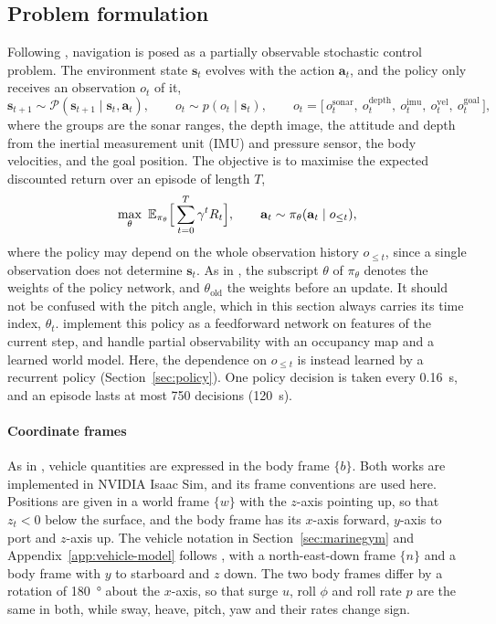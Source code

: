 \subsection{Problem formulation}
\label{sec:problem}
Following \textcite{deowan2026unified}, navigation is posed as a partially observable stochastic control problem. The environment state $\mathbf{s}_t$ evolves with the action $\mathbf{a}_t$, and the policy only receives an observation $o_t$ of it,
\begin{equation}
  \mathbf{s}_{t+1} \sim \mathcal{P}(\mathbf{s}_{t+1} \mid \mathbf{s}_t, \mathbf{a}_t), \qquad
  o_t \sim p(o_t \mid \mathbf{s}_t), \qquad
  o_t = \bigl[\, o^{\mathrm{sonar}}_t,\ o^{\mathrm{depth}}_t,\ o^{\mathrm{imu}}_t,\ o^{\mathrm{vel}}_t,\ o^{\mathrm{goal}}_t \,\bigr],
  \label{eq:observation}
\end{equation}
where the groups are the sonar ranges, the depth image, the attitude and depth from the inertial measurement unit (IMU) and pressure sensor, the body velocities, and the goal position. The objective is to maximise the expected discounted return over an episode of length $T$,
\begin{equation}
  \max_{\theta}\ \mathbb{E}_{\pi_\theta}\Bigl[\,\sum_{t=0}^{T} \gamma^t R_t \Bigr],
  \qquad \mathbf{a}_t \sim \pi_\theta(\mathbf{a}_t \mid o_{\le t}),
  \label{eq:objective}
\end{equation}
where the policy may depend on the whole observation history $o_{\le t}$, since a single observation does not determine $\mathbf{s}_t$. As in \textcite{deowan2026unified}, the subscript $\theta$ of $\pi_\theta$ denotes the weights of the policy network, and $\theta_{\mathrm{old}}$ the weights before an update. It should not be confused with the pitch angle, which in this section always carries its time index, $\theta_t$. \textcite{deowan2026unified} implement this policy as a feedforward network on features of the current step, and handle partial observability with an occupancy map and a learned world model. Here, the dependence on $o_{\le t}$ is instead learned by a recurrent policy (Section~\ref{sec:policy}). One policy decision is taken every \SI{0.16}{\second}, and an episode lasts at most 750 decisions (\SI{120}{\second}).

\paragraph{Coordinate frames}
As in \textcite{deowan2026unified}, vehicle quantities are expressed in the body frame $\{b\}$. Both works are implemented in NVIDIA Isaac Sim, and its frame conventions are used here. Positions are given in a world frame $\{w\}$ with the $z$-axis pointing up, so that $z_t < 0$ below the surface, and the body frame has its $x$-axis forward, $y$-axis to port and $z$-axis up. The vehicle notation in Section~\ref{sec:marinegym} and Appendix~\ref{app:vehicle-model} follows \textcite{fossen2021handbook}, with a north-east-down frame $\{n\}$ and a body frame with $y$ to starboard and $z$ down. The two body frames differ by a rotation of \SI{180}{\degree} about the $x$-axis, so that surge $u$, roll $\phi$ and roll rate $p$ are the same in both, while sway, heave, pitch, yaw and their rates change sign.


